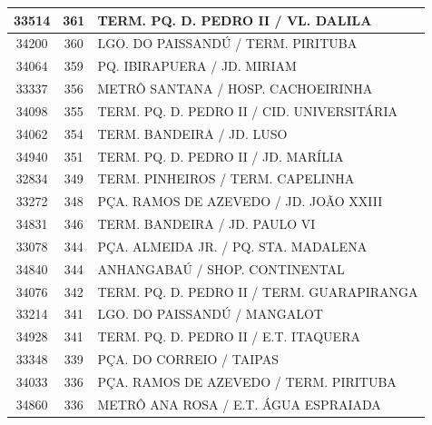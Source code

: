 \documentclass[
	12pt,				%
	oneside,			%
	a4paper,			%
	english,			%
	brazil				%
	]{abntex2ppgsi}
\begin{document}
\begin{apendicesenv}
\begin{longtable}{c|c|p{7cm}}
    33514 & 361   & TERM. PQ. D. PEDRO II / VL. DALILA \\
\hline

    34200 & 360   & LGO. DO PAISSANDÚ / TERM. PIRITUBA \\
\hline

    34064 & 359   & PQ. IBIRAPUERA / JD. MIRIAM \\
\hline

    33337 & 356   & METRÔ SANTANA / HOSP. CACHOEIRINHA \\
\hline

    34098 & 355   & TERM. PQ. D. PEDRO II / CID. UNIVERSITÁRIA \\
\hline

    34062 & 354   & TERM. BANDEIRA / JD. LUSO \\
\hline

    34940 & 351   & TERM. PQ. D. PEDRO II / JD. MARÍLIA \\
\hline

    32834 & 349   & TERM. PINHEIROS / TERM. CAPELINHA \\
\hline

    33272 & 348   & PÇA. RAMOS DE AZEVEDO / JD. JOÃO XXIII \\
\hline

    34831 & 346   & TERM. BANDEIRA / JD. PAULO VI \\
\hline

    33078 & 344   & PÇA. ALMEIDA JR. / PQ. STA. MADALENA \\
\hline

    34840 & 344   & ANHANGABAÚ / SHOP. CONTINENTAL \\
\hline

    34076 & 342   & TERM. PQ. D. PEDRO II / TERM. GUARAPIRANGA \\
\hline

    33214 & 341   & LGO. DO PAISSANDÚ / MANGALOT \\
\hline

    34928 & 341   & TERM. PQ. D. PEDRO II / E.T. ITAQUERA \\
\hline

    33348 & 339   & PÇA. DO CORREIO / TAIPAS \\
\hline

    34033 & 336   & PÇA. RAMOS DE AZEVEDO / TERM. PIRITUBA \\
\hline

    34860 & 336   & METRÔ ANA ROSA / E.T. ÁGUA ESPRAIADA \\
\hline


\end{longtable}
\end{apendicesenv}
\end{document}
